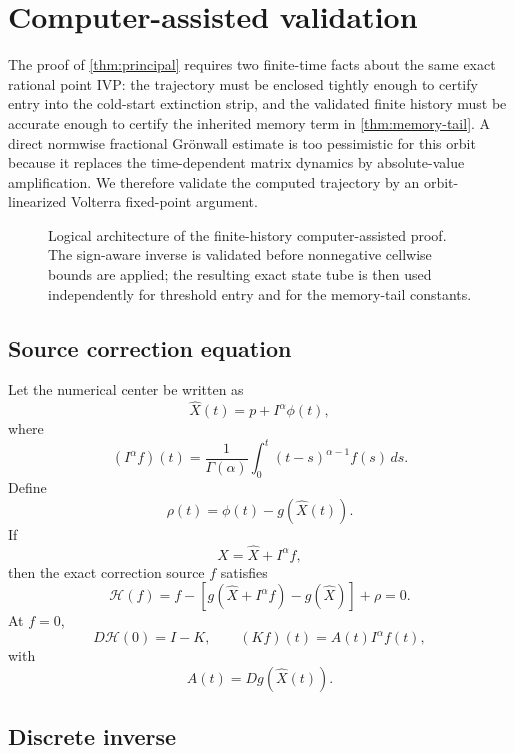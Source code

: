 \section{Computer-assisted validation}
\label{sec:cap}

The proof of \cref{thm:principal} requires two finite-time facts about the same exact rational point IVP: the trajectory must be enclosed tightly enough to certify entry into the cold-start extinction strip, and the validated finite history must be accurate enough to certify the inherited memory term in \cref{thm:memory-tail}. A direct normwise fractional Grönwall estimate is too pessimistic for this orbit because it replaces the time-dependent matrix dynamics by absolute-value amplification. We therefore validate the computed trajectory by an orbit-linearized Volterra fixed-point argument.

\begin{figure}[t]
  \centering
  \resizebox{\textwidth}{!}{}
  \caption{Logical architecture of the finite-history computer-assisted proof.  The sign-aware inverse is validated before nonnegative cellwise bounds are applied; the resulting exact state tube is then used independently for threshold entry and for the memory-tail constants.}
  \label{fig:cap-architecture}
\end{figure}

\subsection{Source correction equation}

Let the numerical center be written as
\[
  \widehat X(t)
  =
  p+I^\alpha\phi(t),
\]
where
\[
  (I^\alpha f)(t)
  =
  \frac1{\Gamma(\alpha)}
  \int_0^t(t-s)^{\alpha-1}f(s)\,ds.
\]
Define
\[
  \rho(t)
  =
  \phi(t)-g(\widehat X(t)).
\]
If
\[
  X=\widehat X+I^\alpha f,
\]
then the exact correction source \(f\) satisfies
\begin{equation}
  \mathcal H(f)
  =
  f-
  \left[
  g(\widehat X+I^\alpha f)-g(\widehat X)
  \right]
  +\rho
  =
  0.
  \label{eq:source-equation}
\end{equation}
At \(f=0\),
\[
  D\mathcal H(0)=I-K,
  \qquad
  (Kf)(t)=A(t)I^\alpha f(t),
\]
with
\[
  A(t)=Dg(\widehat X(t)).
\]

\subsection{Discrete inverse}

